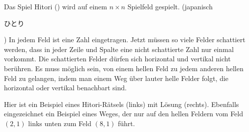 Das Spiel Hitori () wird auf einem $n\times n$ Spielfeld gespielt.
(japanisch \begin{CJK}{UTF8}{min}ひとり\end{CJK})
In jedem Feld ist eine Zahl eingetragen.
Jetzt müssen so viele Felder schattiert werden, dass in jeder
Zeile und Spalte eine nicht schattierte Zahl nur einmal vorkommt.
Die schattierten Felder dürfen sich horizontal und vertikal nicht
berühren.
Es muss möglich sein, von einem hellen Feld zu jedem anderen hellen
Feld zu gelangen, indem man einem Weg über lauter helle Felder folgt,
die horizontal oder vertikal benachbart sind.

Hier ist ein Beispiel eines Hitori-Rätsels (links) mit Lösung (rechts).
Ebenfalls eingezeichnet ein Beispiel eines Weges, der nur auf den
hellen Feldern vom Feld $(2,1)$ links unten zum Feld $(8,1)$ führt.

